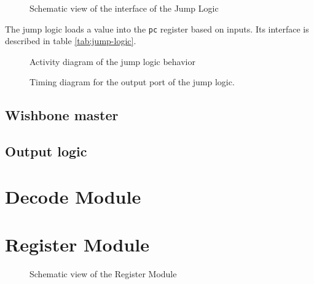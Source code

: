 \begin{figure}[H]
    \centering
    
    \caption{Schematic view of the interface of the Jump Logic}
    \label{fig:jump-logic}
\end{figure}

\begin{content}
  The jump logic loads a value into the \texttt{pc} register based on inputs. Its interface is described in table \ref{tab:jump-logic}.
\end{content}



\begin{content}
\end{content}

\begin{figure}[H]
    \centering
    
    \caption{Activity diagram of the jump logic behavior}
    \label{fig:jump-logic-behavior}
\end{figure}

\begin{figure}[H]
    \centering
    
    \caption{Timing diagram for the output port of the jump logic.}
    \label{fig:jump-logic-output}
\end{figure}

\subsection{Wishbone master}

\subsection{Output logic}

\newpage
\section{Decode Module}
\newpage

\section{Register Module}

\begin{figure}[h!]
    \centering
    
    \caption{Schematic view of the Register Module}
    \label{fig:regm}
\end{figure}

